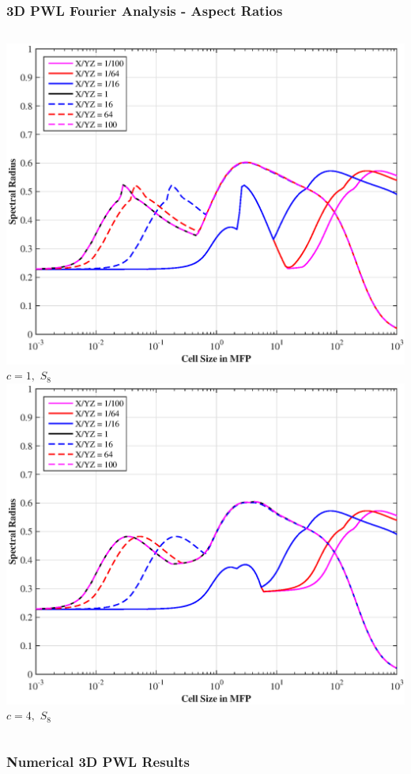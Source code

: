 \documentclass[compress,10pt]{beamer}
\begin{document}
\begin{frame}[t]
{}
{
\frametitle{3D PWL Fourier Analysis - Aspect Ratios}
\vspace{1cm}
\begin{columns}
\centering
\includegraphics[width=\textwidth]{images/SI_MIP_hex_PWLD1_AR1.eps}\\
$c=1,$ $S_8$
\centering
\includegraphics[width=\textwidth]{images/SI_MIP_hex_PWLD1_AR4.eps}\\
$c=4,$ $S_8$
\end{columns}
}
{
\frametitle{Numerical 3D PWL Results}
\vspace{1cm}
}
\end{frame}
\end{document}
